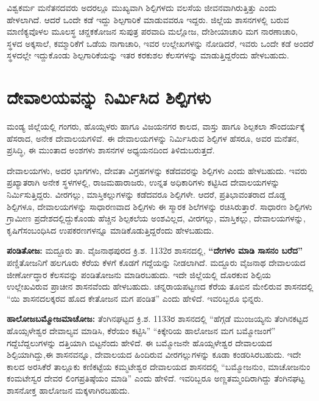 ವಿಶ್ವಕರ್ಮ ಮನೆತನದವರು ಅದರಲ್ಲೂ ಮುಖ್ಯವಾಗಿ ಶಿಲ್ಪಿಗಳದು ವಲಸೆಯ ಜೀವನವಾಗಿರುತ್ತಿತ್ತು ಎಂದು ಹೇಳಲಾಗಿದೆ. ಆದರೆ ಒಂದೇ ಕಡೆ ಇದ್ದು ಶಿಲ್ಪಗಾರಿಕೆ ಮಾಡುವವರೂ ಇದ್ದರು. ಜಿಲ್ಲೆಯ ಶಾಸನಗಳಲ್ಲಿ ಬರುವ ಮಾಣಿಕ್ಯವೊಳಲ ಮೂಲಸ್ಥ ಚನ್ದಕಕೋಜನ ಸುಪುತ್ರ ಪರವಾದಿ ಮಲ್ಲೋಜ, ದೇಶೀಯಾಚಾರಿ ಮಗ ನಾರಣಾಚಾರಿ, ಸ್ಥಳದ ಅಕ್ಕಸಾಲೆ, ಕಮ್ಮಾರಿಕೆಗೆ ಒಡೆಯ ನಾಗಾಚಾರಿ, ಇವರ ಉಲ್ಲೇಖಗಳನ್ನು ನೋಡಿದರೆ, ಇವರು ಒಂದೇ ಕಡೆ ಅಂದರೆ ಸ್ಥಳದಲ್ಲೇ ಇದ್ದುಕೊಂಡು ಶಿಲ್ಪಗಾರಿಕೆಯನ್ನು ಇತರ ಕರಕುಶಲ ಕೆಲಸಗಳನ್ನು ಮಾಡುತ್ತಿದ್ದರೆಂದು ಹೇಳಬಹುದು.

\section{ದೇವಾಲಯವನ್ನು ನಿರ್ಮಿಸಿದ ಶಿಲ್ಪಿಗಳು}

ಮಂಡ್ಯ ಜಿಲ್ಲೆಯಲ್ಲಿ ಗಂಗರು, ಹೊಯ್ಸಳರು ಹಾಗೂ ವಿಜಯನಗರ ಕಾಲದ, ವಾಸ್ತು ಹಾಗೂ ಶಿಲ್ಪಕಲಾ ಸೌಂದರ್ಯಕ್ಕೆ ಹೆಸರಾದ, ಅನೇಕ ದೇವಾಲಯಗಳಿವೆ. ಈ ದೇವಾಲಯಗಳನ್ನು ನಿರ್ಮಿಸಿರುವ ಶಿಲ್ಪಿಗಳ ಹೆಸರೂ, ಅವರ ಮನೆತನ, ಪ್ರಸಿದ್ಧಿ, ಈ ಮುಂತಾದ ಅಂಶಗಳು ಶಾಸನಗಳ ಅಧ್ಯಯನದಿಂದ ತಿಳಿದುಬರುತ್ತದೆ.

ದೇವಾಲಯಗಳು, ಅದರ ಭಾಗಗಳು, ದೇವತಾ ವಿಗ್ರಹಗಳನ್ನು ಕಡೆದವರನ್ನು ಶಿಲ್ಪಿಗಳು ಎಂದು ಹೇಳಬಹುದು. ಇವರು ಪ್ರಖ್ಯಾತರಾಗಿ ಅನೇಕ ಸ್ಥಳಗಳಲ್ಲಿ, ರಾಜಮಹಾರಾಜರು, ಉನ್ನತ ಅಧಿಕಾರಿಗಳು ಕಟ್ಟಿಸಿದ ದೇವಾಲಯಗಳನ್ನು ನಿರ್ಮಿಸು\-ತ್ತಿದ್ದರು. ವೀರಗಲ್ಲು, ಮಾಸ್ತಿಕಲ್ಲುಗಳನ್ನು ಕಡೆದವರೂ ಶಿಲ್ಪಿಗಳೇ. ಆದರೆ, ಪ್ರತಿಭಾವಂತರಾದ ದೊಡ್ಡ ಶಿಲ್ಪಿಗಳೂ, ದೇವಾಲಯಗಳನ್ನು ಸಾಧಾರಣವಾದ ಶಿಲ್ಪಿಗಳು ಈ ಸ್ಮಾರಕ ಶಿಲೆಗಳನ್ನು ರಚಿಸಿರುತ್ತಾರೆ. ಸಾಧಾರಣ ಶಿಲ್ಪಿಗಳು ಗ್ರಾಮೀಣ ಪ್ರದೇಶದಲ್ಲಿದ್ದುಕೊಂಡು ಹೆಚ್ಚಿನ ಶಿಲ್ಪಕಲೆಯ ಅಂಶವಿಲ್ಲದ, ವೀರಗಲ್ಲು, ಮಾಸ್ತಿಕಲ್ಲು, ದೇವಾಲಯಗಳನ್ನು, ಕೃಷಿಗೆ\break ಸಂಬಂಧಿಸಿದ ಉಪಕರಣಗಳನ್ನೂ ಮಾಡಿಕೊಡುತ್ತಿದ್ದರೆಂದು ಹೇಳಬಹುದು.

\textbf{ಪಂಡಿತೋಜ:} ಮದ್ದೂರು ತಾ. ವೈಜನಾಥಪುರದ ಕ್ರಿ.ಶ. 1132ರ ಶಾಸನದಲ್ಲಿ, \textbf{“ದೇಗಳಂ ಮಾಡಿ ಸಾಸನಂ ಬರೆದ”} ಪಣ್ಡಿತೋಜನಿಗೆ ಹಲಗೂರು ಕೆರೆಯ ಕೆಳಗೆ ಕೊಡಗೆ ಗದ್ದೆಯನ್ನು ನೀಡಲಾಗಿದೆ. ಮದ್ದೂರು ವೈಜನಾಥ ದೇವಾಲಯದ ಜೀರ್ಣೋದ್ಧಾರ ಕೆಲಸವನ್ನು ಪಂಡಿತೋಜನು ಮಾಡಿರಬಹುದು. ಇದೇ ಜಿಲ್ಲೆಯಲ್ಲಿ ದೊರಕುವ ಶಿಲ್ಪಿಯ ಉಲ್ಲೇಖವಿರುವ ಪ್ರಾಚೀನ ಶಾಸನವೆಂದು ಹೇಳಬಹುದು. ಚನ್ನರಾಯಪಟ್ಟಣದ ಕೆರೆಯ ತೂಬಿನ ಮೇಲಿರುವ ಶಾಸನದಲ್ಲಿ “ಯಿ ಶಾಸನದಲಕ್ಕರವ ಹೊದ ಕೇತೋಜನ ಮಗ ಪಂಡಿತ” ಎಂದು ಹೇಳಿದೆ. ಇವರಿಬ್ಬರೂ ಭಿನ್ನರು.

\textbf{ಹಾಲೋಜ\general{\enginline{-}}ಬಮ್ಮೋಜ\general{\enginline{-}}ಮಾಚೋಜ:} ತೆಂಗಿನಘಟ್ಟದ ಕ್ರಿ.ಶ. 1133ರ ಶಾಸನದಲ್ಲಿ “ಹೆಗ್ಗಡೆ ಮುಂಜಯ್ಯನು ತೆಂಗಿನಕಟ್ಟದ ಹೊಯ್ಸಳೇಶ್ವರ ದೇವಾಲ್ಯವ ಮಾಡಿಸಿ, ಕೆರೆಯಂ ಕಟ್ಟಿಸಿ” “ಕಿಕ್ಕೇರಿಯ ಹಾಲೋಜನ ಮಗ ಬಮ್ಮೋಜಂಗೆ” ಗದ್ದೆಬೆದ್ದಲುಗಳನ್ನು ದತ್ತಿಯಾಗಿ ಬಿಟ್ಟನೆಂದು ಹೇಳಿದೆ. ಈ ಬಮ್ಮೋಜನೇ ಹೊಯ್ಸಳೇಶ್ವರ ದೇವಾಲಯದ ಶಿಲ್ಪಿಯಾಗಿದ್ದು,\break ಈ ಶಾಸನವನ್ನೂ, ದೇವಾಲಯದ ಹಿಂದಿರುವ ವೀರಗಲ್ಲುಗಳನ್ನು ಕೂಡಾ ಕಂಡರಿಸಿರಬಹುದು. ಇದೇ ಕಾಲದ ಅರಸಿಕೆರೆ ತಾಲ್ಲೂಕು ಕಣಿಕಟ್ಟೆಯ ಕಮ್ಮಟೇಶ್ವರ ದೇವಾಲಯದ ಶಾಸನದಲ್ಲಿ “ಬಮ್ಮೋಜನುಂ, ಮಾಚೋಜನುಂ ಕಂಮಟೇಸ್ವರ ದೇವರ ಲಿಂಗ\-ಪ್ರತಿಷ್ಠೆಯಂ ಮಾಡಿ” ಎಂದು ಹೇಳಿದೆ. ಇವರಿಬ್ಬರೂ ಅಣ್ಣತಮ್ಮಂದಿರಾಗಿದ್ದು ತೆಂಗಿನಘಟ್ಟ ಶಾಸನೋಕ್ತ ಹಾಲೋಜನ ಮಕ್ಕಳಾಗಿರಬಹುದು.

